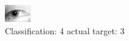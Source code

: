 \begin{figure}[h!]
\begin{center}
\includegraphics[width=0.60\columnwidth]{figures/ID1288_class_4_target_3.png}
\end{center}
\caption{ Classification: 4 actual target: 3}
\label{fig:ID1288_class_4_target_3}
\end{figure}
